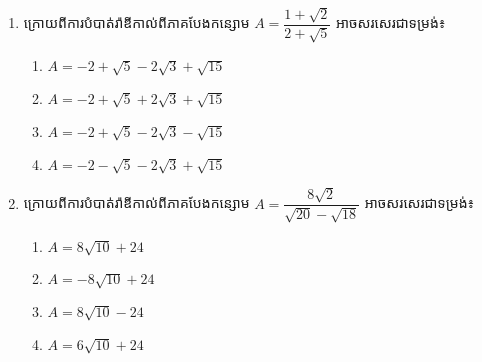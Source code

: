 \begin{enumerate}
\item ក្រោយពីការបំបាត់រ៉ាឌីកាល់ពីភាគបែងកន្សោម $A=\dfrac{1+\sqrt{2}}{2+\sqrt{5}}$ អាចសរសេរជាទម្រង់៖
\begin{multicols}{2}
\begin{enumerate}[label=\alph*.]
	\item $A={-2+\sqrt{5}-2\sqrt{3}+\sqrt{15}}$
	\item $A={-2+\sqrt{5}+2\sqrt{3}+\sqrt{15}}$
	\item $A={-2+\sqrt{5}-2\sqrt{3}-\sqrt{15}}$
	\item $A={-2-\sqrt{5}-2\sqrt{3}+\sqrt{15}}$
\end{enumerate}
\end{multicols}

\item ក្រោយពីការបំបាត់រ៉ាឌីកាល់ពីភាគបែងកន្សោម $A=\dfrac{8\sqrt{2}}{\sqrt{20}-\sqrt{18}}$ អាចសរសេរជាទម្រង់៖
\begin{multicols}{2}
\begin{enumerate}[label=\alph*.]
	\item $A=8\sqrt{10}+24$
	\item $A=-8\sqrt{10}+24$
	\item $A=8\sqrt{10}-24$
	\item $A=6\sqrt{10}+24$
\end{enumerate}
\end{multicols}
\end{enumerate}
\newpage
\problem
